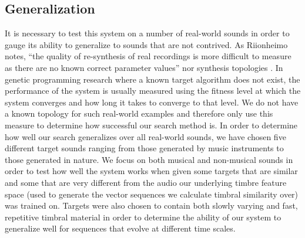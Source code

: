 \documentclass[12pt]{report} 	%
\numberwithin{figure}{chapter}
\numberwithin{table}{chapter}
\numberwithin{equation}{chapter}
\begin{document}
\begin{flushleft}
\section{Generalization}
It is necessary to test this system on a number of real-world sounds in order to gauge its ability to generalize to sounds that are not contrived. As Riionheimo notes, ``the quality of re-synthesis of real recordings is more difficult to measure as there are no known correct parameter values'' nor synthesis topologies \cite[p. 13]{Riionheimo:2003qo}. In genetic programming research where a known target algorithm does not exist, the performance of the system is usually measured using the fitness level at which the system converges and how long it takes to converge to that level. We do not have a known topology for such real-world examples and therefore only use this measure to determine how successful our search method is. In order to determine how well our search generalizes over all real-world sounds, we have chosen five different target sounds ranging from those generated by music instruments to those generated in nature. We focus on both musical and non-musical sounds in order to test how well the system works when given some targets that are similar and some that are very different from the audio our underlying timbre feature space (used to generate the vector sequences we calculate timbral similarity over) was trained on. Targets were also chosen to contain both slowly varying and fast, repetitive timbral material in order to determine the ability of our system to generalize well for sequences that evolve at different time scales.


\end{flushleft}
\end{document}
